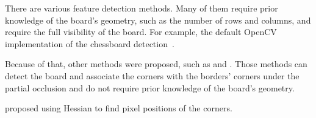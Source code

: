 There are various feature detection methods. Many of them require
prior knowledge of the board's geometry, such as the number of rows and columns,
and require the full visibility of the board. For example, the default OpenCV
implementation of the chessboard detection~\citep{OpenCVCameraCalibration}.

Because of that, other methods were proposed, such as
\cite{fuersattelOCPADOccludedCheckerboard2016} and
\cite{geigerAutomaticCameraRange2012}. Those methods can detect the board and
associate the corners with the borders' corners under
the partial occlusion and do not require prior knowledge of the board's geometry.

\cite{chenNewSubPixelDetector2005} proposed using Hessian to find pixel
positions of the corners.
